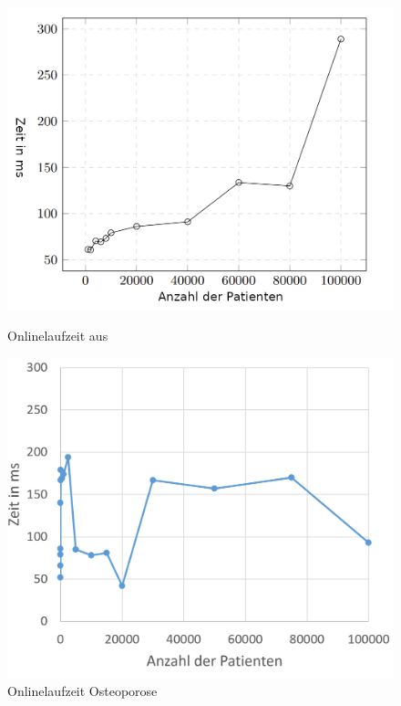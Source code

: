 \documentclass[german,version-2020-11]{uzl-thesis}
\begin{document}
	\begin{figure}[ht]
	\begin{minipage}{.5\textwidth}
		\centering
		\includegraphics[width=0.9\linewidth]{assets/paperLaufzeit.PNG}
		\caption{Onlinelaufzeit aus \cite{guarnieri2017securing}}
		\label{fig:paperlaufzeit}
	\end{minipage}
	\begin{minipage}{.5\textwidth}
		\centering
		\includegraphics[width=0.9\linewidth]{assets/onlineSkript.png}
		\caption{Onlinelaufzeit Osteoporose}
		\label{fig:unserelaufzeit}
	\end{minipage}
\end{figure}
\end{document}
